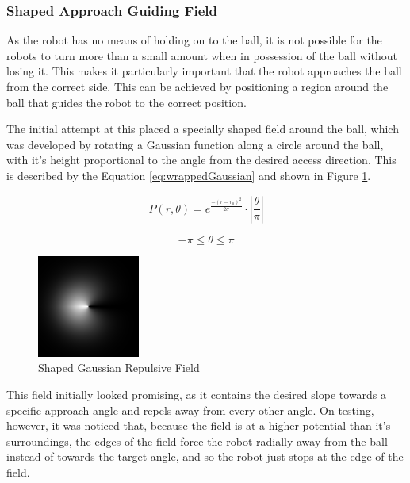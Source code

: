 \documentclass[10pt]{article}
\begin{document}
\subsubsection{Shaped Approach Guiding Field\label{sub:Shaped-Approach-Guiding}}

As the robot has no means of holding on to the ball, it is not possible for the
robots to turn more than a small amount when in possession of the ball without
losing it. This makes it particularly important that the robot approaches the
ball from the correct side. This can be achieved by positioning a region around
the ball that guides the robot to the correct position.

The initial attempt at this placed a specially shaped field around the ball,
which was developed by rotating a Gaussian function along a circle around the
ball, with it's height proportional to the angle from the desired access
direction. This is described by the Equation \ref{eq:wrappedGaussian} and shown
in Figure \ref{fig:wrappedGaussianField}.

\begin{equation}
P\left(r,\theta\right)=e^{\frac{-\left(r-r_{0}\right)^{2}}{2\sigma}}\cdot\left|\frac{\theta}{\pi}\right|\label{eq:wrappedGaussian}
\end{equation}

\[
-\pi\leq\theta\leq\pi
\]

\begin{figure}
 \centering
 \includegraphics[width=0.3\textwidth]{Images/wrapped-field}
 \caption{Shaped Gaussian Repulsive Field}
 \label{fig:wrappedGaussianField}
\end{figure}

This field initially looked promising, as it contains the desired slope towards
a specific approach angle and repels away from every other angle. On testing,
however, it was noticed that, because the field is at a higher potential than
it's surroundings, the edges of the field force the robot radially away from the
ball instead of towards the target angle, and so the robot just stops at the
edge of the field.
\end{document}
